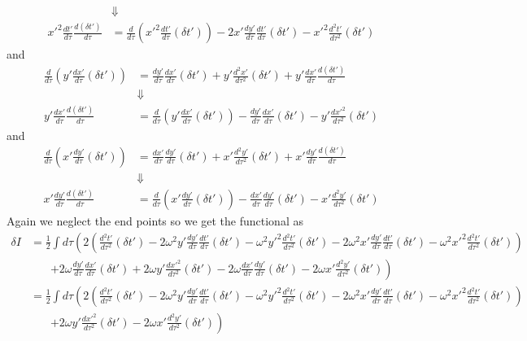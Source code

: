 \documentclass[11pt]{article}
\numberwithin{equation}{section}
\begin{document}
\begin{enumerate}[(a)]
\begin{align*}
&\Downarrow\\
x'^2\frac{dt'}{d\tau}\frac{d(\delta t')}{d\tau} &= \frac{d}{d\tau}\left(x'^2\frac{dt'}{d\tau}(\delta t')\right) - 2x'\frac{dy'}{d\tau}\frac{dt'}{d\tau}(\delta t') - x'^2\frac{d^2t'}{d\tau^2}(\delta t') 
\end{align*}
and
\begin{align*}
\frac{d}{d\tau}\left(y'\frac{dx'}{d\tau}(\delta t')\right) &= \frac{dy'}{d\tau}\frac{dx'}{d\tau}(\delta t') + y'\frac{d^2x'}{d\tau^2}(\delta t') + y'\frac{dx'}{d\tau}\frac{d(\delta t')}{d\tau}\\
&\Downarrow\\
y'\frac{dx'}{d\tau}\frac{d(\delta t')}{d\tau} &= \frac{d}{d\tau}\left(y'\frac{dx'}{d\tau}(\delta t')\right) - \frac{dy'}{d\tau}\frac{dx'}{d\tau}(\delta t') - y'\frac{dx'^2}{d\tau^2}(\delta t') 
\end{align*}
and 
\begin{align*}
\frac{d}{d\tau}\left(x'\frac{dy'}{d\tau}(\delta t')\right) &= \frac{dx'}{d\tau}\frac{dy'}{d\tau}(\delta t') + x'\frac{d^2y'}{d\tau^2}(\delta t') +x'\frac{dy'}{d\tau}\frac{d(\delta t')}{d\tau}\\
&\Downarrow\\
x'\frac{dy'}{d\tau}\frac{d(\delta t')}{d\tau} &= \frac{d}{d\tau}\left(x'\frac{dy'}{d\tau}(\delta t')\right) - \frac{dx'}{d\tau}\frac{dy'}{d\tau}(\delta t') - x'\frac{d^2y'}{d\tau^2}(\delta t') 
\end{align*}
Again we neglect the end points so we get the functional as
\begin{align*}
\delta I &= \frac{1}{2}\int d\tau \left(2\left(\frac{d^2t'}{d\tau^2}(\delta t')  - 2\omega^2y'\frac{dy'}{d\tau}\frac{dt'}{d\tau}(\delta t') - \omega^2y'^2\frac{d^2t'}{d\tau^2}(\delta t')  - 2\omega^2x'\frac{dy'}{d\tau}\frac{dt'}{d\tau}(\delta t') - \omega^2x'^2\frac{d^2t'}{d\tau^2}(\delta t') \right)\right.\\ 
& \ \ \ \ \ \ \ \ \left.+ 2\omega\frac{dy'}{d\tau}\frac{dx'}{d\tau}(\delta t') + 2\omega y'\frac{dx'^2}{d\tau^2}(\delta t')   -2\omega \frac{dx'}{d\tau}\frac{dy'}{d\tau}(\delta t') -2\omega x'\frac{d^2y'}{d\tau^2}(\delta t') \right)\\
&= \frac{1}{2}\int d\tau \left(2\left(\frac{d^2t'}{d\tau^2}(\delta t')  - 2\omega^2y'\frac{dy'}{d\tau}\frac{dt'}{d\tau}(\delta t') - \omega^2y'^2\frac{d^2t'}{d\tau^2}(\delta t')  - 2\omega^2x'\frac{dy'}{d\tau}\frac{dt'}{d\tau}(\delta t') - \omega^2x'^2\frac{d^2t'}{d\tau^2}(\delta t') \right)\right.\\ 
& \ \ \ \ \ \ \ \ \left.+ 2\omega y'\frac{dx'^2}{d\tau^2}(\delta t')  -2\omega x'\frac{d^2y'}{d\tau^2}(\delta t') \right)\\

\end{align*}
\end{enumerate}
\end{document}
